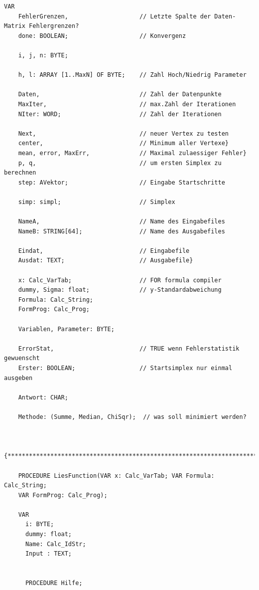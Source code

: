 \begin{refsection}
\begin{lstlisting}[caption=Simplex]
  VAR
    FehlerGrenzen,                    // Letzte Spalte der Daten-Matrix Fehlergrenzen?
    done: BOOLEAN;                    // Konvergenz

    i, j, n: BYTE;

    h, l: ARRAY [1..MaxN] OF BYTE;    // Zahl Hoch/Niedrig Parameter

    Daten,                            // Zahl der Datenpunkte
    MaxIter,                          // max.Zahl der Iterationen
    NIter: WORD;                      // Zahl der Iterationen

    Next,                             // neuer Vertex zu testen
    center,                           // Minimum aller Vertexe}
    mean, error, MaxErr,              // Maximal zulaessiger Fehler}
    p, q,                             // um ersten Simplex zu berechnen
    step: AVektor;                    // Eingabe Startschritte

    simp: simpl;                      // Simplex

    NameA,                            // Name des Eingabefiles
    NameB: STRING[64];                // Name des Ausgabefiles

    Eindat,                           // Eingabefile
    Ausdat: TEXT;                     // Ausgabefile}

    x: Calc_VarTab;                   // FOR formula compiler
    dummy, Sigma: float;              // y-Standardabweichung
    Formula: Calc_String;
    FormProg: Calc_Prog;

    Variablen, Parameter: BYTE;

    ErrorStat,                        // TRUE wenn Fehlerstatistik gewuenscht
    Erster: BOOLEAN;                  // Startsimplex nur einmal ausgeben

    Antwort: CHAR;

    Methode: (Summe, Median, ChiSqr);  // was soll minimiert werden?


    {****************************************************************************}

    PROCEDURE LiesFunction(VAR x: Calc_VarTab; VAR Formula: Calc_String;
    VAR FormProg: Calc_Prog);

    VAR
      i: BYTE;
      dummy: float;
      Name: Calc_IdStr;
      Input : TEXT;


      PROCEDURE Hilfe;


\end{lstlisting}
\end{refsection}
